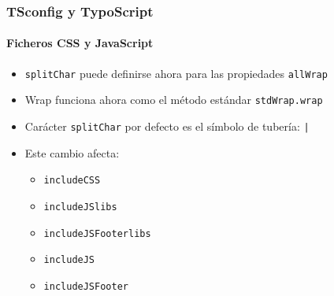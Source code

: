 
\begin{frame}[fragile]
	\frametitle{TSconfig y TypoScript}
	\framesubtitle{Ficheros CSS y JavaScript}

	\begin{itemize}
		\item \texttt{splitChar} puede definirse ahora para las propiedades \texttt{allWrap}
		\item Wrap funciona ahora como el método estándar \texttt{stdWrap.wrap}
		\item Carácter \texttt{splitChar} por defecto es el símbolo de tubería: \texttt{|}
		\item Este cambio afecta:

			\begin{itemize}
				\item \texttt{includeCSS}
				\item \texttt{includeJSlibs}
				\item \texttt{includeJSFooterlibs}
				\item \texttt{includeJS}
				\item \texttt{includeJSFooter}
			\end{itemize}

	\end{itemize}

\end{frame}



